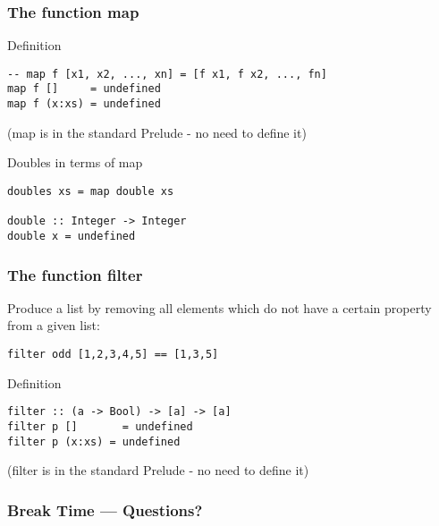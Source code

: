 \documentclass{beamer}
\begin{document}
\begin{frame}[fragile]
  \frametitle{The function map}
  \begin{block}{Definition}
\begin{verbatim}
-- map f [x1, x2, ..., xn] = [f x1, f x2, ..., fn]
map f []     = undefined
map f (x:xs) = undefined
\end{verbatim}
    (map is in the standard Prelude - no need to define it)
  \end{block}
  \begin{block}{Doubles in terms of map}
\begin{verbatim}
doubles xs = map double xs

double :: Integer -> Integer
double x = undefined
\end{verbatim}
  \end{block}
\end{frame}
\begin{frame}[fragile]
  \frametitle{The function filter}
  Produce a list by removing all elements 
  which do not have a certain property from 
  a given list: 

\begin{verbatim}
filter odd [1,2,3,4,5] == [1,3,5]
\end{verbatim}

  \begin{block}{Definition}
\begin{verbatim}
filter :: (a -> Bool) -> [a] -> [a]
filter p []       = undefined
filter p (x:xs) = undefined
\end{verbatim}
(filter is in the standard Prelude - no need to define it)
  \end{block}
\end{frame}

\begin{frame}
  \frametitle{Break Time --- Questions?}
  \begin{center}
  \end{center}
\end{frame}
\end{document}
